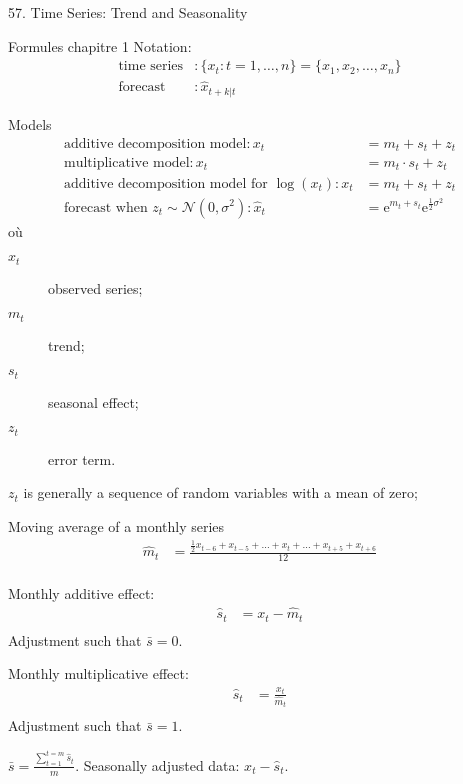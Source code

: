 \begin{CHPT_SUMM_AUTO}[label = {L.-57}]{57. Time Series: Trend and Seasonality}
\begin{FORMULA_SUMM}{Formules chapitre 1}
Notation:
	\begin{align*}
	\text{time series}&:	
		\{x_{t} : t = 1, \dots, n\} 
	= 	\{x_{1}, x_{2}, \dots, x_{n}\}	\\
	\text{forecast}	&:	
		\hat{x}_{t + k | t}
	\end{align*}
	
Models
	\begin{align*}
	\text{additive decomposition model}	:	
	x_{t}	
	&=	m_{t} + s_{t} + z_{t}		\\
	\text{multiplicative model}	:	
	x_{t}	
	&=	m_{t} \cdot s_{t} + z_{t}		\\
	\text{additive decomposition model for }\log(x_{t})	:	
	x_{t}	
	&=	m_{t} + s_{t} + z_{t}	\\
	\text{forecast when }z_{t} \sim \mathcal{N}(0, \sigma^{2})	:
	\hat{x}_{t}	
	&=	\text{e}^{m_{t} + s_{t}}\text{e}^{\frac{1}{2}\sigma^{2}}
	\end{align*}
où
	\begin{multicols*}{2}
	\begin{description}
	\item[$x_{t}$]	observed series;
	\item[$m_{t}$]	trend;
	\item[$s_{t}$]	seasonal effect;
	\item[$z_{t}$]	error term.
	\end{description}
	\end{multicols*}
$z_{t}$ is generally a sequence of random variables with a mean of zero;

Moving average of a monthly series
	\setlength{\mathindent}{-1cm}
	\begin{align*}
	\hat{m}_{t}
	&=	\frac{\frac{1}{2} x_{t - 6} + x_{t - 5} + \dots + x_{t} + \dots + x_{t + 5} + x_{t + 6}}{12}	\\
	\end{align*}
	\setlength{\mathindent}{1cm}

	
Monthly additive effect:
	\begin{align*}
	\hat{s}_{t} 
	&= 	x_{t} - \hat{m}_{t}	\\
	\end{align*}
Adjustment such that $\bar{s} = 0$.
	
Monthly multiplicative effect:
	\begin{align*}
	\hat{s}_{t} 
	&= 	\frac{x_{t}}{\hat{m}_{t}}	\\
	\end{align*}
Adjustment such that $\bar{s} = 1$.


$\bar{s} = \frac{\sum_{t = 1}^{t = m}\hat{s}_{t}}{m}$.
Seasonally adjusted data: $x_{t} - \hat{s}_{t}$.
\end{FORMULA_SUMM}
\tcbline
\end{CHPT_SUMM_AUTO}

